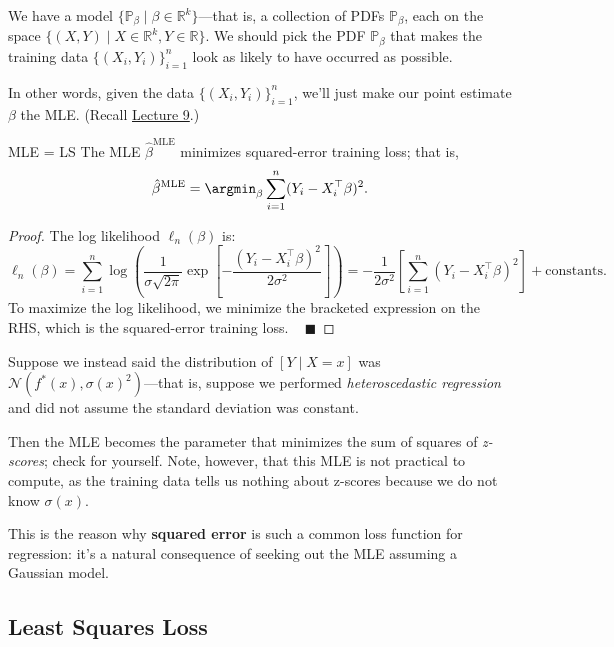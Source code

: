 We have a model $\{\mathbb{P}_{\beta} \mid \beta \in \mathbb{R}^k\}$---that is,
a collection of PDFs $\mathbb{P}_{\beta}$, each on the space
$\{(X, Y) \mid X \in \mathbb{R}^k, Y \in \mathbb{R}\}$.
We should pick the PDF $\mathbb{P}_{\beta}$
that makes the training data $\{(X_i, Y_i)\}_{i = 1}^n$
look as likely to have occurred as possible.

In other words, given the data $\{(X_i, Y_i)\}_{i = 1}^n$,
we'll just make our point estimate $\beta$ the MLE.
(Recall \href{/18.650/lectures/9/#defining-the-maximum-likelihood-estimator-mle}{Lecture 9}.)

\begin{theorem}{MLE = LS}
    The MLE $\hat{\beta}^{\mathrm{MLE}}$ minimizes
    squared-error training loss; that is,
    \[ \hat{\beta}^{\mathrm{MLE}}
    = \argmin_{\beta} \sum_{i = 1}^n (Y_i - X_i^{\top}\beta)^2. \]
\end{theorem}

\begin{proof}
    The log likelihood $\ell_n(\beta)$ is:
    \[ \ell_n(\beta)
    = \sum_{i = 1}^n \log\left(
        \frac{1}{\sigma\sqrt{2\pi}} \exp\left[
            -\frac{(Y_i - X_i^{\top}\beta)^2}{2\sigma^2}
        \right]
    \right)
    = -\frac{1}{2\sigma^2}\left[
        \sum_{i = 1}^n (Y_i - X_i^{\top}\beta)^2
    \right] + \text{constants}. \]
    To maximize the log likelihood,
    we minimize the bracketed expression on the RHS,
    which is the squared-error training loss. ~ $\blacksquare$
\end{proof}

\begin{remark}
    Suppose we instead said the distribution of $[Y \mid X = x]$
    was $\mathcal{N}(f^*(x), \sigma(x)^2)$---that is,
    suppose we performed \emph{heteroscedastic regression}
    and did not assume the standard deviation was constant.

    Then the MLE becomes the parameter
    that minimizes the sum of squares of \emph{z-scores};
    check for yourself.
    Note, however, that this MLE is not practical to compute,
    as the training data tells us nothing about z-scores
    because we do not know $\sigma(x)$.
\end{remark}

This is the reason why \textbf{squared error}
is such a common loss function for regression:
it's a natural consequence of seeking out the MLE
assuming a Gaussian model.

\subsection{Least Squares Loss}


